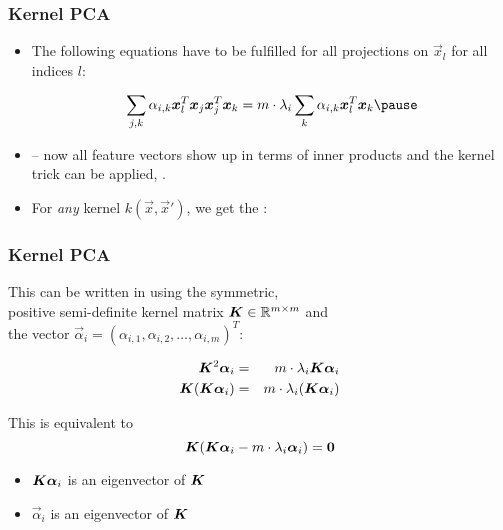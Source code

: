 \begin{frame}
	\frametitle{Kernel PCA \cont}

	\begin{itemize}
		\item The following equations have to be fulfilled for all projections on $\vec x_l$ for all indices $l$:

		      \begin{displaymath}
			      \sum_{j,k} \alpha_{i,k}\vec x_l^T \vec x_j \vec x_j^T\vec x_k =
			      m \cdot \lambda_i \sum_{k} \alpha_{i,k} \vec x_l^T\vec x_k \pause
		      \end{displaymath}
		\item {} -- now all feature vectors show up in terms of inner products and the kernel trick can be applied, . \\[.5cm] \pause

		\item For \emph{any} kernel $k(\vec x, \vec x')$, we get the : \\[.25cm]

		      \begin{center}
		      \end{center}

	\end{itemize}
\end{frame}


\begin{frame}
	\frametitle{Kernel PCA \cont}

	This can be written in  using the symmetric, \\
	positive semi-definite kernel matrix ${\bm K}\in \mathbb{R}^{m\times m}$ and \\
	the vector $\vec \alpha_i = (\alpha_{i,1}, \alpha_{i,2}, \dots, \alpha_{i,m})^T$:

	\begin{eqnarray*}
		{\bm K}^2 {\bm \alpha}_i        &=& m\cdot \lambda_i {\bm K} {\bm \alpha}_i\\
		{\bm K} ({\bm K} {\bm \alpha}_i) &=& m\cdot \lambda_i ( {\bm K} {\bm \alpha}_i)
	\end{eqnarray*}
	\pause

	This is equivalent to
	\begin{displaymath}
		{\bm K} ({\bm K} {{\bm \alpha}}_i - m\cdot \lambda_i {\bm \alpha}_i) = {\bm 0}
	\end{displaymath}

	\begin{itemize}
		\item ${\bm K} {\bm \alpha}_i$ is an eigenvector of ${\bm K}$
		\item $\vec \alpha_i$ is an eigenvector of ${\bm K}$
	\end{itemize}
\end{frame}


